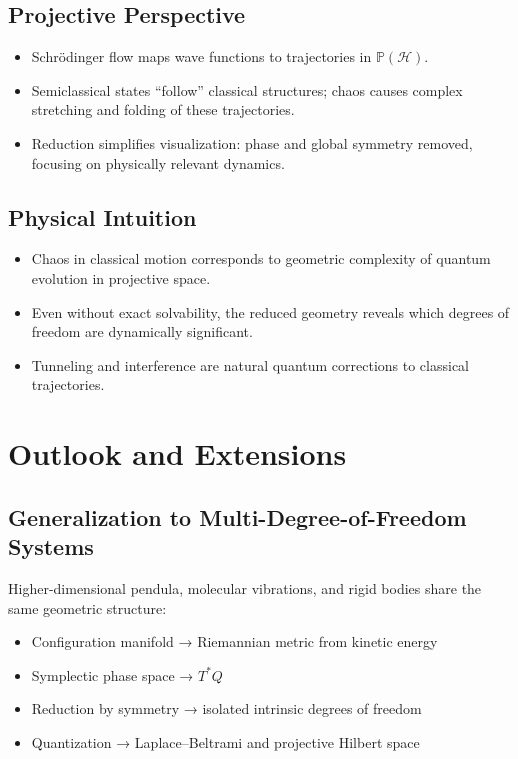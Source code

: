 \documentclass[11pt]{book}
\begin{document}
\section{Projective Perspective}
\begin{itemize}
   \item
 Schrödinger flow maps wave functions to trajectories in $\mathbb{P}(\mathcal{H})$.  
   \item
 Semiclassical states “follow” classical structures; chaos causes complex stretching 
        and folding of these trajectories.  
   \item
 Reduction simplifies visualization: phase and global symmetry removed, focusing on physically relevant dynamics.
\end{itemize}

\section{Physical Intuition}
\begin{itemize}
   \item
 Chaos in classical motion corresponds to geometric complexity of quantum evolution 
        in projective space.  
   \item
 Even without exact solvability, the reduced geometry reveals which degrees of 
        freedom are dynamically significant.  
   \item
 Tunneling and interference are natural quantum corrections to classical trajectories.
\end{itemize}

\chapter{Outlook and Extensions}

\section{Generalization to Multi-Degree-of-Freedom Systems}

 Higher-dimensional pendula, molecular vibrations, and rigid bodies share the same geometric structure:  
 \begin{itemize}
    \item
     Configuration manifold → Riemannian metric from kinetic energy  
    \item
     Symplectic phase space → $T^*Q$  
    \item
     Reduction by symmetry → isolated intrinsic degrees of freedom  
    \item
     Quantization → Laplace–Beltrami and projective Hilbert space  
 \end{itemize}
\end{document}
